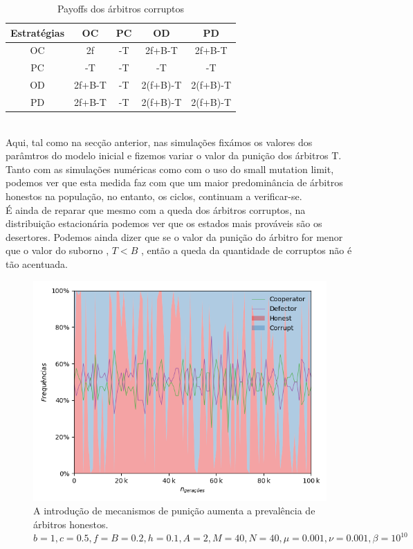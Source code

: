 \documentclass[conference, twocolumn]{IEEEtran}
\theoremstyle{plain}
\theoremstyle{definition}
\theoremstyle{remark}
\begin{document}
    \begin{table}[h]
        \centering
        \begin{tabular}{c|cccc}
            Estratégias&OC&PC&OD&PD\\
            \hline
            OC & 2f & -T & 2f+B-T & 2f+B-T\\
            PC & -T & -T & -T & -T\\
            OD & 2f+B-T & -T & 2(f+B)-T & 2(f+B)-T\\
            PD & 2f+B-T & -T & 2(f+B)-T & 2(f+B)-T\\
        \end{tabular}
        \caption{Payoffs dos árbitros corruptos}
    \end{table}
    \\
    Aqui, tal como na secção anterior, nas simulações fixámos os valores dos parâmtros do modelo inicial e fizemos variar o valor da punição dos árbitros T.
    Tanto com as simulações numéricas como com o uso do small mutation limit, podemos ver que esta medida faz com que um maior predominância de árbitros honestos na população, no entanto, os ciclos, continuam a verificar-se. \\  É ainda de reparar que mesmo com a queda dos árbitros corruptos, na distribuição estacionária podemos ver que os estados mais prováveis são os desertores. Podemos ainda dizer que se o valor da punição do árbitro for menor que o valor do suborno , $T<B$ , então a queda da quantidade de corruptos não é tão acentuada.


    \begin{figure}[h]
        \centering
        \includegraphics[width=1\linewidth]{images/punishment.png}
        \caption{\small A introdução de mecanismos de punição aumenta a prevalência de árbitros honestos. $b=1, c=0.5, f=B=0.2, h=0.1, A=2, M=40, N=40, \mu=0.001, \nu=0.001, \beta=10^{10}$}
        \label{fig:punicao}
    \end{figure}
\end{document}
